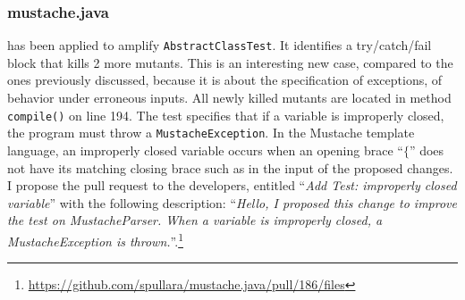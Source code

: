 \subsubsection{mustache.java}
\label{subsubsec:test-improvement:experiment-results:rq1:mustache}


\dspot has been applied to amplify \texttt{AbstractClassTest}. 
It identifies a try/catch/fail block that kills 2 more mutants.
This is an interesting new case, compared to the ones previously discussed, because it is about the specification of exceptions, \ie of behavior under erroneous inputs.
All newly killed mutants are located in method \texttt{compile()} on line 194.
The test specifies that if a variable is improperly closed, the program must throw a \texttt{MustacheException}. 
In the Mustache template language, an improperly closed variable occurs when an opening brace ``$\{$'' does not have its matching closing brace such as in the input of the proposed changes. 
I propose the pull request to the developers, entitled ``\emph{Add Test: improperly closed variable}'' with the following description: ``\emph{Hello, I proposed this change to improve the test on MustacheParser. When a variable is improperly closed, a MustacheException is thrown.}''.\footnote{\url{https://github.com/spullara/mustache.java/pull/186/files}}
